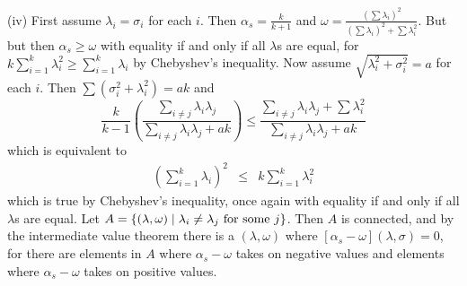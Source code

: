 \documentclass{article}
\makeatletter
\theoremstyle{plain}
\theoremstyle{plain}
\theoremstyle{definition}
\theoremstyle{remark}
\theoremstyle{definition}
\theoremstyle{plain}
\theoremstyle{plain}
\theoremstyle{definition}
\newenvironment{proof}[1][\protect\proofname]{\par
	\normalfont\topsep6\p@\@plus6\p@\relax
	\trivlist
	\itemindent\parindent
	\item[\hskip\labelsep\scshape #1]\ignorespaces
}{%
	\endtrivlist\@endpefalse
}
\providecommand{\proofname}{Proof}
\makeatother
\begin{document}
\begin{proof}[Proof of Proposition \ref{prop:Reliabilities.}]
(iv) First assume $\lambda_{i}=\sigma_{i}$ for each $i$. Then $\alpha_{s}=\frac{k}{k+1}$
and $\omega=\frac{\left(\sum\lambda_{i}\right)^{2}}{\left(\sum\lambda_{i}\right)^{2}+\sum\lambda_{i}^{2}}$.
But but then $\alpha_{s}\geq\omega$ with equality if and only if
all $\lambda$s are equal, for $k\sum_{i=1}^{k}\lambda_{i}^{2}\geq\sum_{i=1}^{k}\lambda_{i}$
by Chebyshev's inequality. Now assume $\sqrt{\lambda_{i}^{2}+\sigma_{i}^{2}}=a$
for each $i$. Then $\sum\left(\sigma_{i}^{2}+\lambda_{i}^{2}\right)=ak$
and
\[
\frac{k}{k-1}\left(\frac{\sum_{i\neq j}\lambda_{i}\lambda_{j}}{\sum_{i\neq j}\lambda_{i}\lambda_{j}+ak}\right)\leq\frac{\sum_{i\neq j}\lambda_{i}\lambda_{j}+\sum\lambda_{i}^{2}}{\sum_{i\neq j}\lambda_{i}\lambda_{j}+ak}
\]
which is equivalent to
\begin{eqnarray*}
\left(\sum_{i=1}^{k}\lambda_{i}\right)^{2} & \leq & k\sum_{i=1}^{k}\lambda_{i}^{2}
\end{eqnarray*}
which is true by Chebyshev's inequality, once again with equality
if and only if all $\lambda$s are equal. Let $A=\left\{ \left(\lambda,\omega\right)\mid\lambda_{i}\neq\lambda_{j}\text{\textrm{ for some }}j\right\} $.
Then $A$ is connected, and by the intermediate value theorem there
is a $\left(\lambda,\omega\right)$ where $\left[\alpha_{s}-\omega\right]\left(\lambda,\sigma\right)=0$,
for there are elements in $A$ where $\alpha_{s}-\omega$ takes on
negative values and elements where $\alpha_{s}-\omega$ takes on positive
values.
\end{proof}
\end{document}
